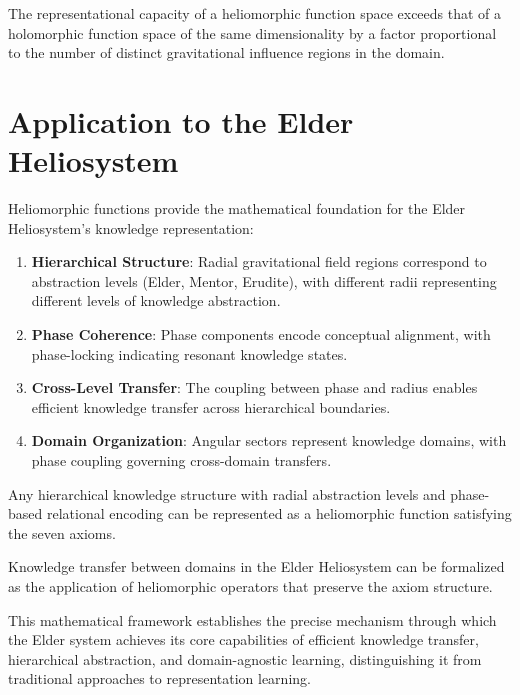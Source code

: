 \begin{theorem}
The representational capacity of a heliomorphic function space exceeds that of a holomorphic function space of the same dimensionality by a factor proportional to the number of distinct gravitational influence regions in the domain.
\end{theorem}

\section{Application to the Elder Heliosystem}

Heliomorphic functions provide the mathematical foundation for the Elder Heliosystem's knowledge representation:

\begin{enumerate}
    \item \textbf{Hierarchical Structure}: Radial gravitational field regions correspond to abstraction levels (Elder, Mentor, Erudite), with different radii representing different levels of knowledge abstraction.
    
    \item \textbf{Phase Coherence}: Phase components encode conceptual alignment, with phase-locking indicating resonant knowledge states.
    
    \item \textbf{Cross-Level Transfer}: The coupling between phase and radius enables efficient knowledge transfer across hierarchical boundaries.
    
    \item \textbf{Domain Organization}: Angular sectors represent knowledge domains, with phase coupling governing cross-domain transfers.
\end{enumerate}

\begin{theorem}
Any hierarchical knowledge structure with radial abstraction levels and phase-based relational encoding can be represented as a heliomorphic function satisfying the seven axioms.
\end{theorem}

\begin{corollary}
Knowledge transfer between domains in the Elder Heliosystem can be formalized as the application of heliomorphic operators that preserve the axiom structure.
\end{corollary}

This mathematical framework establishes the precise mechanism through which the Elder system achieves its core capabilities of efficient knowledge transfer, hierarchical abstraction, and domain-agnostic learning, distinguishing it from traditional approaches to representation learning.